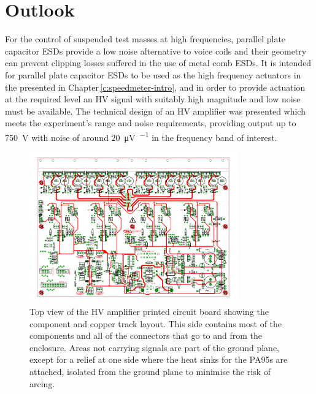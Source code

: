 \section{Outlook}
For the control of suspended test masses at high frequencies, parallel plate capacitor \glspl{ESD} provide a low noise alternative to voice coils and their geometry can prevent clipping losses suffered in the use of metal comb \glspl{ESD}. It is intended for parallel plate capacitor \glspl{ESD} to be used as the high frequency actuators in the \SSMEXPT{} presented in Chapter\,\ref{c:speedmeter-intro}, and in order to provide actuation at the required level an \gls{HV} signal with suitably high magnitude and low noise must be available. The technical design of an \gls{HV} amplifier was presented which meets the experiment's range and noise requirements, providing output up to \SI{750}{\volt} with noise of around \SI{20}{\micro\volt\per\sqrthz} in the frequency band of interest.

\begin{figure}
  \centering
  \includegraphics[width=0.8\textwidth]{graphics/60-hv-amp-top.pdf}
  \caption[High voltage amplifier board, top view]{\label{fig:hv-amp-top}Top view of the \gls{HV} amplifier printed circuit board showing the component and copper track layout. This side contains most of the components and all of the connectors that go to and from the enclosure. Areas not carrying signals are part of the ground plane, except for a relief at one side where the heat sinks for the PA95s are attached, isolated from the ground plane to minimise the risk of arcing.}
\end{figure}

